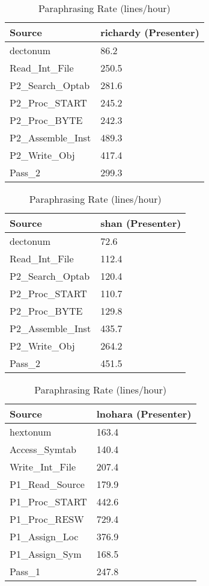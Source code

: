 \begin{table}[hb]
\begin{center}
\begin{tabular}{|l|l|}
\hline
Source & richardy (Presenter)\\
\hline
dectonum & 86.2\\
Read\_Int\_File & 250.5\\
P2\_Search\_Optab & 281.6\\
P2\_Proc\_START & 245.2\\
P2\_Proc\_BYTE & 242.3\\
P2\_Assemble\_Inst & 489.3\\
P2\_Write\_Obj & 417.4\\
Pass\_2 & 299.3\\
\hline
\end{tabular}
\end{center}
\caption{Paraphrasing Rate (lines/hour)}
\end{table}

\begin{table}[hb]
\begin{center}
\begin{tabular}{|l|l|}
\hline
Source & shan (Presenter)\\
\hline
dectonum & 72.6\\
Read\_Int\_File & 112.4\\
P2\_Search\_Optab & 120.4\\
P2\_Proc\_START & 110.7\\
P2\_Proc\_BYTE & 129.8\\
P2\_Assemble\_Inst & 435.7\\
P2\_Write\_Obj & 264.2\\
Pass\_2 & 451.5\\
\hline
\end{tabular}
\end{center}
\caption{Paraphrasing Rate (lines/hour)}
\end{table}

\begin{table}[hb]
\begin{center}
\begin{tabular}{|l|l|}
\hline
Source & lnohara (Presenter)\\
\hline
hextonum & 163.4\\
Access\_Symtab & 140.4\\
Write\_Int\_File & 207.4\\
P1\_Read\_Source & 179.9\\
P1\_Proc\_START & 442.6\\
P1\_Proc\_RESW & 729.4\\
P1\_Assign\_Loc & 376.9\\
P1\_Assign\_Sym & 168.5\\
Pass\_1 & 247.8\\
\hline
\end{tabular}
\end{center}
\caption{Paraphrasing Rate (lines/hour)}
\end{table}

